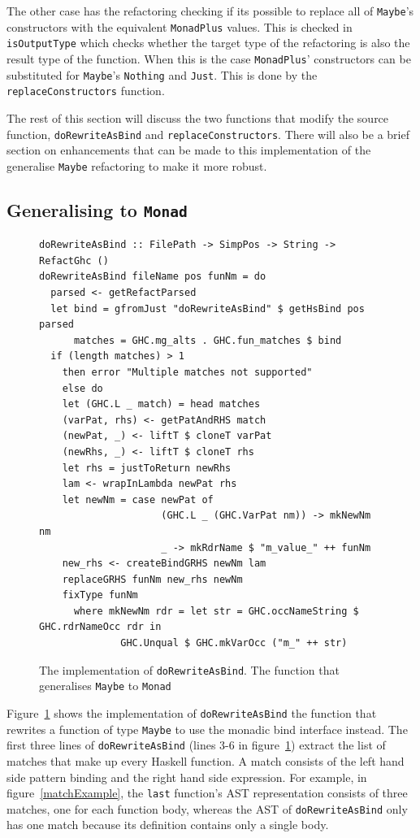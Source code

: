 The other case has the refactoring checking if its possible to replace all of \texttt{Maybe}'s constructors with the equivalent \texttt{MonadPlus} values. This is checked in \texttt{isOutputType} which checks whether the target type of the refactoring is also the result type of the function. When this is the case \texttt{MonadPlus}' constructors can be substituted for \texttt{Maybe}'s \texttt{Nothing} and \texttt{Just}. This is done by the \texttt{replaceConstructors} function.

The rest of this section will discuss the two functions that modify the source function, \texttt{doRewriteAsBind} and \texttt{replaceConstructors}. There will also be a brief section on enhancements that can be made to this implementation of the generalise \texttt{Maybe} refactoring to make it more robust.

\subsection{Generalising to \texttt{Monad}}

\begin{figure}[t]
\begin{lstlisting}
doRewriteAsBind :: FilePath -> SimpPos -> String -> RefactGhc ()
doRewriteAsBind fileName pos funNm = do
  parsed <- getRefactParsed
  let bind = gfromJust "doRewriteAsBind" $ getHsBind pos parsed
      matches = GHC.mg_alts . GHC.fun_matches $ bind
  if (length matches) > 1
    then error "Multiple matches not supported"
    else do
    let (GHC.L _ match) = head matches
    (varPat, rhs) <- getPatAndRHS match
    (newPat, _) <- liftT $ cloneT varPat
    (newRhs, _) <- liftT $ cloneT rhs
    let rhs = justToReturn newRhs
    lam <- wrapInLambda newPat rhs
    let newNm = case newPat of
                     (GHC.L _ (GHC.VarPat nm)) -> mkNewNm nm
                     _ -> mkRdrName $ "m_value_" ++ funNm
    new_rhs <- createBindGRHS newNm lam
    replaceGRHS funNm new_rhs newNm
    fixType funNm
      where mkNewNm rdr = let str = GHC.occNameString $ GHC.rdrNameOcc rdr in
              GHC.Unqual $ GHC.mkVarOcc ("m_" ++ str)
\end{lstlisting}
\caption{The implementation of \texttt{doRewriteAsBind}. The function that generalises \texttt{Maybe} to \texttt{Monad}}
\label{doRewriteAsBind}
\end{figure}

Figure~\ref{doRewriteAsBind} shows the implementation of \texttt{doRewriteAsBind} the function that rewrites a function of type \texttt{Maybe} to use the monadic bind interface instead. The first three lines of \texttt{doRewriteAsBind} (lines 3-6 in figure~\ref{doRewriteAsBind}) extract the list of matches that make up every Haskell function. A match consists of the left hand side pattern binding and the right hand side expression. For example, in figure~\ref{matchExample}, the \texttt{last} function's AST representation consists of three matches, one for each function body, whereas the AST of \texttt{doRewriteAsBind} only has one match because its definition contains only a single body.

